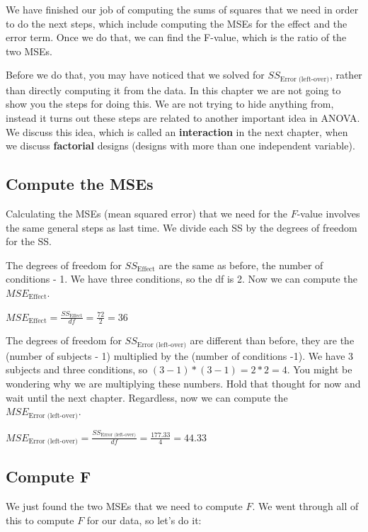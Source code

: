 \documentclass[]{book}
\begin{document}
We have finished our job of computing the sums of squares that we need in order to do the next steps, which include computing the MSEs for the effect and the error term. Once we do that, we can find the F-value, which is the ratio of the two MSEs.

Before we do that, you may have noticed that we solved for \(SS_\text{Error (left-over)}\), rather than directly computing it from the data. In this chapter we are not going to show you the steps for doing this. We are not trying to hide anything from, instead it turns out these steps are related to another important idea in ANOVA. We discuss this idea, which is called an \textbf{interaction} in the next chapter, when we discuss \textbf{factorial} designs (designs with more than one independent variable).

\hypertarget{compute-the-mses}{%
\subsection{Compute the MSEs}\label{compute-the-mses}}

Calculating the MSEs (mean squared error) that we need for the \(F\)-value involves the same general steps as last time. We divide each SS by the degrees of freedom for the SS.

The degrees of freedom for \(SS_\text{Effect}\) are the same as before, the number of conditions - 1. We have three conditions, so the df is 2. Now we can compute the \(MSE_\text{Effect}\).

\(MSE_\text{Effect} = \frac{SS_\text{Effect}}{df} = \frac{72}{2} = 36\)

The degrees of freedom for \(SS_\text{Error (left-over)}\) are different than before, they are the (number of subjects - 1) multiplied by the (number of conditions -1). We have 3 subjects and three conditions, so \((3-1) * (3-1) = 2*2 =4\). You might be wondering why we are multiplying these numbers. Hold that thought for now and wait until the next chapter. Regardless, now we can compute the \(MSE_\text{Error (left-over)}\).

\(MSE_\text{Error (left-over)} = \frac{SS_\text{Error (left-over)}}{df} = \frac{177.33}{4}= 44.33\)

\hypertarget{compute-f}{%
\subsection{Compute F}\label{compute-f}}

We just found the two MSEs that we need to compute \(F\). We went through all of this to compute \(F\) for our data, so let's do it:
\end{document}

